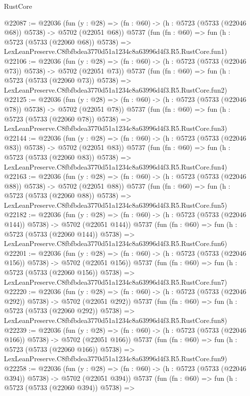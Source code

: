 \begin{lexlean}{RustCore}
\begin{coremodule}
@22087 := @22036
    (fun (y : @28) => (fn : @60) -> (h : @5723 (@5733 (@22046 @68)) @5738) -> @5702 (@22051 @68))
    @5737
    (fun (fn : @60) =>
    fun (h : @5723 (@5733 (@22060 @68)) @5738) =>
    LexLeanPreserve.C8fbfbdea3770d51a1234c8a63996d4f3.R5.RustCore.fun1)
@22106 := @22036
    (fun (y : @28) => (fn : @60) -> (h : @5723 (@5733 (@22046 @73)) @5738) -> @5702 (@22051 @73))
    @5737
    (fun (fn : @60) =>
    fun (h : @5723 (@5733 (@22060 @73)) @5738) =>
    LexLeanPreserve.C8fbfbdea3770d51a1234c8a63996d4f3.R5.RustCore.fun2)
@22125 := @22036
    (fun (y : @28) => (fn : @60) -> (h : @5723 (@5733 (@22046 @78)) @5738) -> @5702 (@22051 @78))
    @5737
    (fun (fn : @60) =>
    fun (h : @5723 (@5733 (@22060 @78)) @5738) =>
    LexLeanPreserve.C8fbfbdea3770d51a1234c8a63996d4f3.R5.RustCore.fun3)
@22144 := @22036
    (fun (y : @28) => (fn : @60) -> (h : @5723 (@5733 (@22046 @83)) @5738) -> @5702 (@22051 @83))
    @5737
    (fun (fn : @60) =>
    fun (h : @5723 (@5733 (@22060 @83)) @5738) =>
    LexLeanPreserve.C8fbfbdea3770d51a1234c8a63996d4f3.R5.RustCore.fun4)
@22163 := @22036
    (fun (y : @28) => (fn : @60) -> (h : @5723 (@5733 (@22046 @88)) @5738) -> @5702 (@22051 @88))
    @5737
    (fun (fn : @60) =>
    fun (h : @5723 (@5733 (@22060 @88)) @5738) =>
    LexLeanPreserve.C8fbfbdea3770d51a1234c8a63996d4f3.R5.RustCore.fun5)
@22182 := @22036
    (fun (y : @28) => (fn : @60) -> (h : @5723 (@5733 (@22046 @144)) @5738) -> @5702 (@22051 @144))
    @5737
    (fun (fn : @60) =>
    fun (h : @5723 (@5733 (@22060 @144)) @5738) =>
    LexLeanPreserve.C8fbfbdea3770d51a1234c8a63996d4f3.R5.RustCore.fun6)
@22201 := @22036
    (fun (y : @28) => (fn : @60) -> (h : @5723 (@5733 (@22046 @156)) @5738) -> @5702 (@22051 @156))
    @5737
    (fun (fn : @60) =>
    fun (h : @5723 (@5733 (@22060 @156)) @5738) =>
    LexLeanPreserve.C8fbfbdea3770d51a1234c8a63996d4f3.R5.RustCore.fun7)
@22220 := @22036
    (fun (y : @28) => (fn : @60) -> (h : @5723 (@5733 (@22046 @292)) @5738) -> @5702 (@22051 @292))
    @5737
    (fun (fn : @60) =>
    fun (h : @5723 (@5733 (@22060 @292)) @5738) =>
    LexLeanPreserve.C8fbfbdea3770d51a1234c8a63996d4f3.R5.RustCore.fun8)
@22239 := @22036
    (fun (y : @28) => (fn : @60) -> (h : @5723 (@5733 (@22046 @166)) @5738) -> @5702 (@22051 @166))
    @5737
    (fun (fn : @60) =>
    fun (h : @5723 (@5733 (@22060 @166)) @5738) =>
    LexLeanPreserve.C8fbfbdea3770d51a1234c8a63996d4f3.R5.RustCore.fun9)
@22258 := @22036
    (fun (y : @28) => (fn : @60) -> (h : @5723 (@5733 (@22046 @394)) @5738) -> @5702 (@22051 @394))
    @5737
    (fun (fn : @60) =>
    fun (h : @5723 (@5733 (@22060 @394)) @5738) =>

\end{coremodule}
\end{lexlean}
